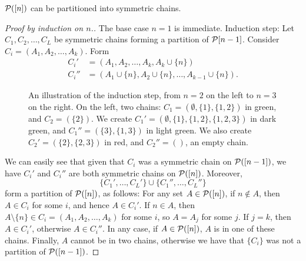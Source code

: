 \pagebreak
\begin{theorem} \label{thm:sym_part}
$\P([n])$ can be partitioned into symmetric chains.
\end{theorem}
\begin{proof}[Proof by induction on $n$.]
 The base case $n=1$ is immediate.
Induction step: Let $C_1,C_2,\dotsc,C_L$ be symmetric chains forming a partition of $\P{[n-1]}$. Consider $C_i = (A_1,A_2,\dotsc,A_k)$. Form 
\begin{align*}	
 C_i' &= (A_1,A_2,\dotsc,A_k,A_k\cup \{n\})\\
 C_i'' &= (A_1 \cup \{n\}, A_2 \cup \{n\}, \dotsc, A_{k-1} \cup \{n\}).
 \end{align*} 
 \begin{figure}
 \begin{center}
 \hfill
{}
\end{center}
\caption{An illustration of the induction step, from $n=2$ on the left to $n=3$ on the right. On the left,  two chains: $C_1 = (\emptyset, \{1\}, \{1,2\})$ in green, and $C_2 = (\{2\})$.
We create $C_1' = (\emptyset, \{1\},\{1,2\},\{1,2,3\})$ in dark green, and $C_1'' = (\{3\}, \{1,3\})$ in light green. We also create $C_2' = (\{2\},\{2,3\})$ in red, and $C_2'' = ()$, an empty chain.%
}%
 \end{figure}
We can easily see that given that $C_i$ was a symmetric chain on $\P([n-1])$, we have $C_i'$ and $C_i''$ are both symmetric chains on $\P([n])$. Moreover, 
\[
\{C_1', \dotsc, C_L'\}\cup \{C_1'', \dotsc, C_L''\}
\]
form a partition of $\P([n])$, as follows:  For any set $A\in \P([n])$, if $n\not \in A$, then $A\in C_i$ for some $i$, and hence $A\in C_i'$. If $n\in A$, then $A\setminus \{n\} \in C_i = (A_1,A_2,\dotsc,A_k)$ for some $i$, so $A = A_j$ for some $j$. If $j=k$, then $A\in C_i'$, otherwise $A\in C_i''$. In any case, if $A\in \P([n])$, $A$ is in one of these chains. Finally, $A$ cannot be in two chains, otherwise we have that $\{C_i\}$ was not a partition of $\P([n-1])$.
\end{proof}

